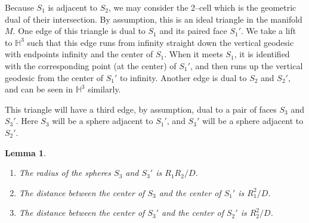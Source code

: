 \documentclass[11pt]{amsart}
\newcommand{\HH}{{\mathbb{H}}}
\theoremstyle{plain}
\newtheorem{lemma}[theorem]{Lemma}
\theoremstyle{definition}
\begin{document}
Because $S_1$ is adjacent to $S_2$, we may consider the 2--cell which
is the geometric dual of their intersection.  By assumption, this is
an ideal triangle in the manifold $M$.  One edge of this triangle is
dual to $S_1$ and its paired face $S_1'$.  We take a lift to $\HH^3$
such that this edge runs from infinity straight down the vertical
geodesic with endpoints infinity and the center of $S_1$.  When it
meets $S_1$, it is identified with the corresponding point (at the
center) of $S_1'$, and then runs up the vertical geodesic from the
center of $S_1'$ to infinity.  Another edge is dual to $S_2$ and
$S_2'$, and can be seen in $\HH^3$ similarly.

This triangle will have a third edge, by assumption, dual to a pair of
faces $S_3$ and $S_3'$.  Here $S_3$ will be a sphere adjacent to
$S_1'$, and $S_3'$ will be a sphere adjacent to $S_2'$.


\begin{lemma}
\begin{enumerate}
	\item[(a)] The radius of the spheres $S_3$ and $S_3'$ is $R_1R_2/D$.
	\item[(b)] The distance between the center of $S_3$ and the center
		of $S_1'$ is $R_1^2/D$.
	\item[(c)] The distance between the center of $S_3'$ and the center
of $S_2'$ is $R_2^2/D$.
\end{enumerate}
\label{lemma:ford-circles}
\end{lemma}
\end{document}
